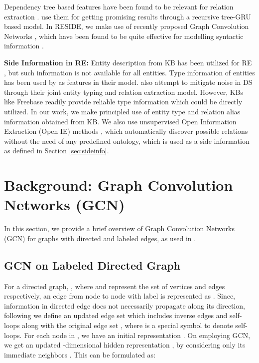\documentclass[11pt,a4paper]{article}
\newcommand{\refsec}[1]{Section \ref{#1}}
\newcommand{\method}{RESIDE}
\begin{document}
Dependency tree based features have been found to be relevant for relation extraction \cite{mintz2009distant}. \citet{see_paper} use them for getting promising results through a recursive tree-GRU based model. In \method{}, we make use of recently proposed Graph Convolution Networks \cite{Defferrard:2016:CNN:3157382.3157527,kipf2016semi}, which have been found to be quite effective for modelling syntactic information \cite{gcn_srl,gcn_event,neuraldater_paper}.

\textbf{Side Information in RE:} Entity description from KB has been utilized for RE \cite{entity_description}, but such information is not available for all entities. Type information of entities has been used by \citet{figer_paper,Liu2014ExploringFE} as features in their model. \citet{typeinfo2017} also attempt to mitigate noise in DS through their joint entity typing and relation extraction model. However, KBs like Freebase readily provide reliable type information which could be directly utilized. In our work, we make principled use of entity type and relation alias information obtained from KB. We also use unsupervised Open Information Extraction (Open IE) methods \cite{ollie,stanford_openie}, which automatically discover possible relations without the need of any predefined ontology, which is used as a side information as defined in \refsec{sec:sideinfo}.



 \section{Background: Graph Convolution Networks (GCN)}
\label{sec:gcn_background}

In this section, we provide a brief overview of Graph Convolution Networks (GCN) for graphs with directed and labeled edges, as used in \cite{gcn_srl}. 

\subsection{GCN on Labeled Directed Graph}

For a directed graph, , where  and  represent the set of vertices and edges respectively, an edge from node  to node  with label  is represented as . Since, information in directed edge does not necessarily propagate along its direction, following \cite{gcn_srl} we define an updated edge set  which includes inverse edges  and self-loops  along with the original edge set , where  is a special symbol to denote self-loops. For each node  in , we have an initial representation . On employing GCN, we get an updated -dimensional hidden representation , by considering only its immediate neighbors \cite{kipf2016semi}. This can be formulated as:
\end{document}
